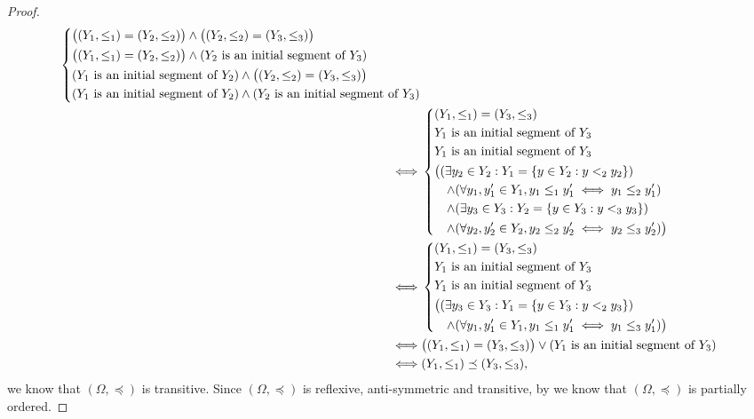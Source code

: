 \begin{proof}
\begin{align*}
\begin{dcases}
             \big((Y_1, \leq_1) = (Y_2, \leq_2)\big) \land \big((Y_2, \leq_2) = (Y_3, \leq_3)\big)     \\
             \big((Y_1, \leq_1) = (Y_2, \leq_2)\big) \land (Y_2 \text{ is an initial segment of } Y_3) \\
             (Y_1 \text{ is an initial segment of } Y_2) \land \big((Y_2, \leq_2) = (Y_3, \leq_3)\big) \\
             (Y_1 \text{ is an initial segment of } Y_2) \land (Y_2 \text{ is an initial segment of } Y_3)
           \end{dcases}                                                                      \\
    \iff & \begin{dcases}
             (Y_1, \leq_1) = (Y_3, \leq_3)                                                 \\
             Y_1 \text{ is an initial segment of } Y_3                                     \\
             Y_1 \text{ is an initial segment of } Y_3                                     \\
             \big((\exists y_2 \in Y_2 : Y_1 = \left\lbrace y \in Y_2 : y <_2 y_2\right\rbrace)                \\
             \quad \land (\forall y_1, y_1' \in Y_1, y_1 \leq_1 y_1' \iff y_1 \leq_2 y_1') \\
             \quad \land (\exists y_3 \in Y_3 : Y_2 = \left\lbrace y \in Y_3 : y <_3 y_3\right\rbrace)         \\
             \quad \land (\forall y_2, y_2' \in Y_2, y_2 \leq_2 y_2' \iff y_2 \leq_3 y_2')\big)
           \end{dcases}                                                                                 \\
    \iff & \begin{dcases}
             (Y_1, \leq_1) = (Y_3, \leq_3)                                  \\
             Y_1 \text{ is an initial segment of } Y_3                      \\
             Y_1 \text{ is an initial segment of } Y_3                      \\
             \big((\exists y_3 \in Y_3 : Y_1 = \left\lbrace y \in Y_3 : y <_2 y_3\right\rbrace) \\
             \quad \land (\forall y_1, y_1' \in Y_1, y_1 \leq_1 y_1' \iff y_1 \leq_3 y_1')\big)
           \end{dcases}                                                                                 \\
    \iff & \big((Y_1, \leq_1) = (Y_3, \leq_3)\big) \lor (Y_1 \text{ is an initial segment of } Y_3)                                                                          \\
    \iff & (Y_1, \leq_1) \preceq (Y_3, \leq_3),
  \end{align*}
  we know that \((\Omega, \preceq)\) is transitive.
  Since \((\Omega, \preceq)\) is reflexive, anti-symmetric and transitive, by  we know that \((\Omega, \preceq)\) is partially ordered.


\end{proof}
